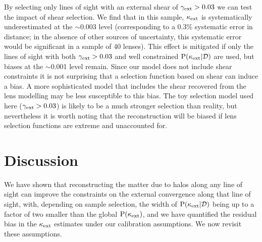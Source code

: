 \documentclass[useAMS,usenatbib]{mn2e}
\begin{document}
By selecting only lines of sight with an external shear of $\gamma_{\rm ext}>0.03$ we
can test the impact of shear selection. We find that in this sample, $\kappa_{\rm ext}$
is systematically underestimated at the $\sim$0.003 level (corresponding to a
0.3\% systematic error in distance; in the absence of other sources of uncertainty, this
systematic error would be significant in a sample of 40 lenses). 
This effect is mitigated if only
the lines of sight with both $\gamma_{\rm ext}>0.03$ and well constrained ${\rm P}(\kappa_{\rm ext}|{\mathcal{D}})$ are
used, but biases at the $\sim$0.001 level remain. Since our model does not
include shear constraints it is not surprising that a selection function based on shear
can induce a bias. A more sophisticated model that includes the shear
recovered from the lens modelling may be less susceptible to this bias. The
toy selection model used here ($\gamma_{\rm ext}>0.03$) is likely to be a much
stronger selection than reality, but nevertheless it is worth noting that the
reconstruction \proceedure will be biased if lens selection functions are
extreme and unaccounted for.



\section{Discussion}
\label{sec:discuss}

We have shown that reconstructing the matter due to halos along any line of
sight can improve the constraints on the external convergence along that line
of sight, with, depending on sample selection,  the width of
${\rm P}(\kappa_{\rm ext}|{\mathcal{D}})$ being up to a factor of two smaller than the global
${\rm P}(\kappa_{\rm ext})$, and  we have quantified the residual bias in the $\kappa_{\rm ext}$
estimates under our calibration assumptions. We now revisit these assumptions.
\end{document}
